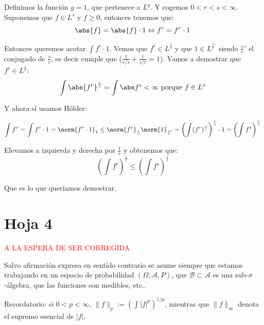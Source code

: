 \begin{problem}[8]
\begin{enumerate}
Definimos la función $g=1$, que pertenece a $L^q$. Y cogemos $0<r<s<\infty$. Suponemos que $f \in L^s$ y $f\geq 0$, entonces tenemos que:
\[
\abs{f}=\abs{f}\cdot 1  \Leftrightarrow f^r = f^r \cdot 1
\]

Entonces queremos acotar $\int f^r \cdot 1$. Vemos que $f^r \in L^{\frac{s}{r}}$ y que $1 \in L^{\frac{s}{r}'}$  siendo $\frac{s}{r}'$ el conjugado de $\frac{s}{r}$, es decir cumple que ($\frac{1}{r/s}+\frac{1}{s/r} = 1$). Vamos a demostrar que  $f^r \in L^{\frac{s}{r}}$:
\[
 \int \abs{f^r}^{\frac{s}{r}} =  \int \abs f^s < \infty \text{ porque } f\in L^s
\]

Y ahora sí usamos Hölder:

\[
\int f^r = \int f^r \cdot 1 = \norm{f^r \cdot 1}_1 \leq \norm{f^r}_{\frac{s}{r}}\norm{1}_{\frac{s}{r}'}=\left( \int(f^r)^{\frac{s}{r}} \right)^{\frac{r}{s}} \cdot 1 = \left( \int f^s \right)^{\frac{r}{s}}
\]

Elevamos a izquierda y derecha por $\frac{1}{r}$ y obtenemos que:
\[
\left( \int f^r \right)^{\frac{1}{r}} \leq \left( \int f^s \right)^{\frac{1}{s}}
\]

Que es lo que queríamos demostrar.
\end{enumerate}



\end{problem}




\newpage
\section{Hoja 4}

\textcolor{red}{A LA ESPERA DE SER CORREGIDA}

Salvo afirmaci\'on expresa en sentido
contrario se asume siempre que estamos trabajando en un espacio de probabilidad $(\Omega, \mathcal{A}, P)$,
que  $\mathcal{B}\subset \mathcal{A}$ es una sub-$\sigma$-\'algebra, que las funciones son medibles, etc..

Recordatorio: si $0 < p < \infty$, $\|f\|_p := \left(\int|f|^p\right)^{1/p}$, mientras que
$\|f\|_\infty$ denota el supremo esencial de $|f|$. 

